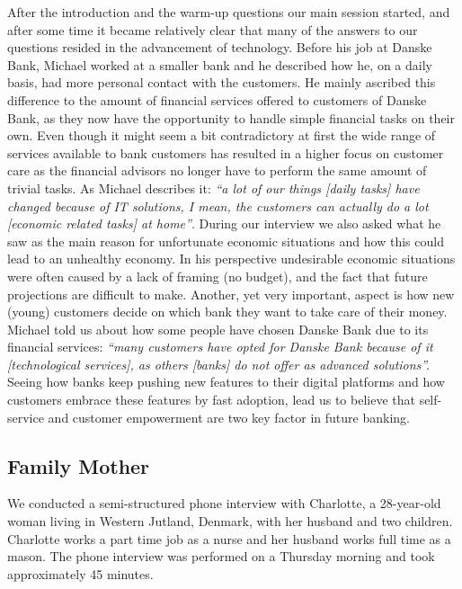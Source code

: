 After the introduction and the warm-up questions our main session started, and after some time it became relatively clear that many of the answers to our questions resided in the advancement of technology. Before his job at Danske Bank, Michael worked at a smaller bank and he described how he, on a daily basis, had more personal contact with the customers. He mainly ascribed this difference to the amount of financial services offered to customers of Danske Bank, as they now have the opportunity to handle simple financial tasks on their own. Even though it might seem a bit contradictory at first the wide range of services available to bank customers has resulted in a higher focus on customer care as the financial advisors no longer have to perform the same amount of trivial tasks. As Michael describes it: \emph{“a lot of our things [daily tasks] have changed because of IT solutions, I mean, the customers can actually do a lot [economic related tasks] at home”}.
During our interview we also asked what he saw as the main reason for unfortunate economic situations and how this could lead to an unhealthy economy. In his perspective undesirable economic situations were often caused by a lack of framing (no budget), and the fact that future projections are difficult to make. Another, yet very important, aspect is how new (young) customers decide on which bank they want to take care of their money. Michael told us about how some people have chosen Danske Bank due to its financial services: \emph{“many customers have opted for Danske Bank because of it [technological services], as others [banks] do not offer as advanced solutions”.} Seeing how banks keep pushing new features to their digital platforms and how customers embrace these features by fast adoption, lead us to believe that self-service and customer empowerment are two key factor in future banking.

\subsection{Family Mother}
We conducted a semi-structured phone interview \cite[chapter~7]{sharp2007interaction} with Charlotte, a 28-year-old woman living in Western Jutland, Denmark, with her husband and two children. Charlotte works a part time job as a nurse and her husband works full time as a mason. The phone interview was performed on a Thursday morning and took approximately 45 minutes.

